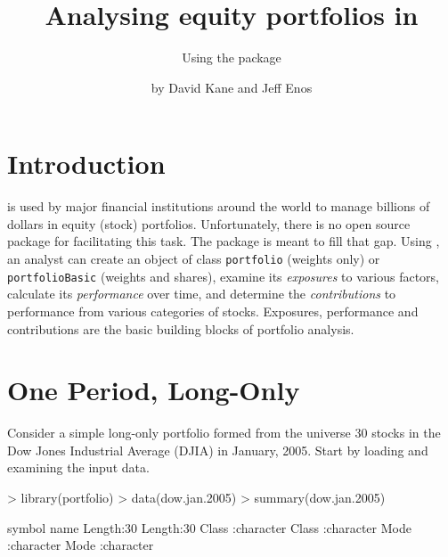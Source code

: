 \documentclass[a4paper]{report}
\begin{document}
\begin{article}
\title{Analysing equity portfolios in \R{}}
\subtitle{Using the  package}
\author{by David Kane and Jeff Enos}



\maketitle


\section*{Introduction}

\R{} is used by major financial institutions around the world to
manage billions of dollars in equity (stock) portfolios.
Unfortunately, there is no open source \R{} package for facilitating
this task. The  package is meant to fill that gap.
Using , an analyst can create an object of class
\texttt{portfolio} (weights only) or \texttt{portfolioBasic} (weights
and shares), examine its \emph{exposures} to various factors,
calculate its \emph{performance} over time, and determine the
\emph{contributions} to performance from various categories of stocks.
Exposures, performance and contributions are the basic building blocks
of portfolio analysis.

\section*{One Period, Long-Only}

Consider a simple long-only portfolio formed from the universe 30
stocks in the Dow Jones Industrial Average (DJIA) in January, 2005. Start by
loading and examining the input data.

\begin{Schunk}
\begin{Sinput}
> library(portfolio)
> data(dow.jan.2005)
> summary(dow.jan.2005)
\end{Sinput}
\begin{Soutput}
    symbol              name          
 Length:30          Length:30         
 Class :character   Class :character  
 Mode  :character   Mode  :character  
                                      
                                      
                                      

\end{Soutput}
\end{Schunk}
\end{article}
\end{document}
